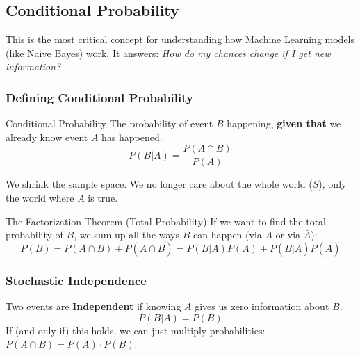 \subsection{Conditional Probability}

This is the most critical concept for understanding how Machine Learning models (like Naive Bayes) work. It answers: \textit{How do my chances change if I get new information?}

\subsubsection{Defining Conditional Probability}

\begin{defbox}{Conditional Probability}
The probability of event $B$ happening, \textbf{given that} we already know event $A$ has happened.
\begin{equation}
    P(B|A) = \frac{P(A \cap B)}{P(A)}
\end{equation}
\end{defbox}
We shrink the sample space. We no longer care about the whole world ($S$), only the world where $A$ is true.


\begin{defbox}{The Factorization Theorem (Total Probability)}
If we want to find the total probability of $B$, we sum up all the ways $B$ can happen (via $A$ or via $\bar{A}$):
\begin{equation}
    P(B) = P(A \cap B) + P(\bar{A} \cap B) =P(B|A)P(A) + P(B|\bar{A})P(\bar{A})
\end{equation}
\end{defbox}

\subsubsection{Stochastic Independence}
Two events are \textbf{Independent} if knowing $A$ gives us zero information about $B$.
\begin{equation}
    P(B|A) = P(B)
\end{equation}
If (and only if) this holds, we can just multiply probabilities: $P(A \cap B) = P(A) \cdot P(B)$.

\vspace{0.2cm}

